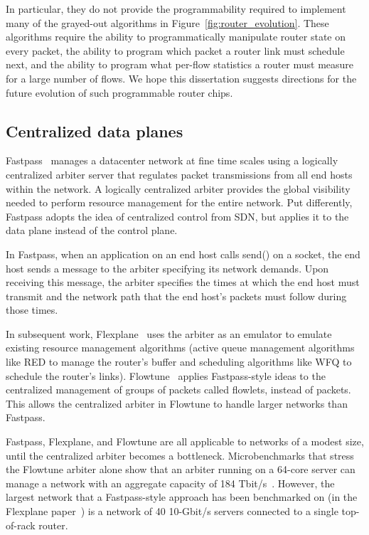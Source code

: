In particular, they do not provide the programmability required to implement
many of the grayed-out algorithms in Figure~\ref{fig:router_evolution}.  These
algorithms require the ability to programmatically manipulate router state on
every packet, the ability to program which packet a router link must schedule
next, and the ability to program what per-flow statistics a router must measure
for a large number of flows. We hope this dissertation suggests directions for
the future evolution of such programmable router chips.

\subsection{Centralized data planes}
Fastpass~\cite{fastpass} manages a datacenter network at fine time scales using
a logically centralized arbiter server that regulates packet transmissions from all
end hosts within the network. A logically centralized arbiter provides the
global visibility needed to perform resource management for the entire network.
Put differently, Fastpass adopts the idea of centralized control from SDN, but
applies it to the data plane instead of the control plane.

In Fastpass, when an application on an end host calls send() on a socket, the
end host sends a message to the arbiter specifying its network demands. Upon
receiving this message, the arbiter specifies the times at which the end host
must transmit and the network path that the end host's packets must follow
during those times. 

In subsequent work, Flexplane~\cite{flexplane} uses the arbiter as an emulator
to emulate existing resource management algorithms (\eg active queue management
algorithms like RED to manage the router's buffer and scheduling algorithms
like WFQ to schedule the router's links).  Flowtune~\cite{flowtune} applies
Fastpass-style ideas to the centralized management of groups of packets called
flowlets, instead of packets.  This allows the centralized arbiter in Flowtune
to handle larger networks than Fastpass.

Fastpass, Flexplane, and Flowtune are all applicable to networks of a modest
size, until the centralized arbiter becomes a bottleneck.  Microbenchmarks that
stress the Flowtune arbiter alone show that an arbiter running on a 64-core
server can manage a network with an aggregate capacity of 184
Tbit/s~\cite{flowtune}. However, the largest network that a Fastpass-style
approach has been benchmarked on (in the Flexplane paper~\cite{flexplane}) is a
network of 40 10-Gbit/s servers connected to a single top-of-rack router.

